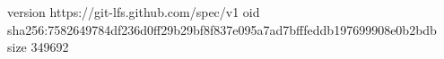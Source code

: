 version https://git-lfs.github.com/spec/v1
oid sha256:7582649784df236d0ff29b29bf8f837e095a7ad7bfffeddb197699908e0b2bdb
size 349692
